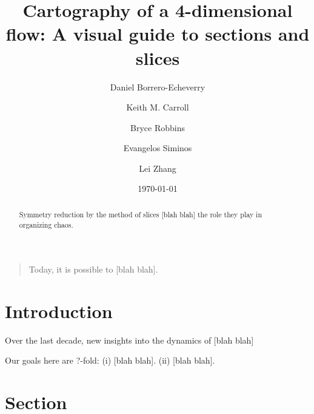 \documentclass[aip,cha,reprint,
secnumarabic,
nofootinbib, tightenlines,
nobibnotes, showkeys, showpacs,
groupedaddress
]{revtex4-1}
\begin{document}
\title[Low-dimensional cartography]
{Cartography of a 4-dimensional flow: A visual guide to sections and slices}

\author{Daniel Borrero-Echeverry}
\author{Keith M. Carroll}
\author{Bryce Robbins}
\author{Evangelos Siminos}
\author{Lei Zhang}

\date{\today}

    \begin{abstract}
Symmetry reduction by the method of slices [blah blah]
the role they play in organizing chaos.
    \end{abstract}


\maketitle

    \begin{quotation}
Today, it is possible to  [blah blah].
    \end{quotation}

\section{Introduction}
\label{s:intro}

Over the last decade, new insights into the dynamics of  [blah blah]

Our goals here are ?-fold:
(i)  [blah blah].
(ii) [blah blah].


\section{Section}
\label{s:cut}
\end{document}
